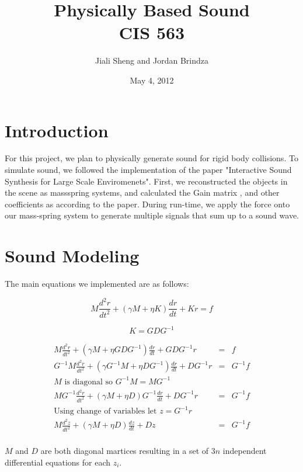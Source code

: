 \documentclass{article}
\begin{document}
\title{Physically Based Sound\\CIS 563}
\date{May 4, 2012}
\author{Jiali Sheng and Jordan Brindza}
\maketitle
  

\section{Introduction}
For this project, we plan to physically generate sound for rigid body collisions. To simulate sound, we followed the implementation of the paper "Interactive Sound Synthesis for Large Scale Enviromenets". First, we reconstructed the objects in the scene as massspring systems, and calculated the Gain matrix , and other coefficients as according to the paper. During run-time, we apply the force onto our mass-spring system to generate multiple signals that sum up to a sound wave. 

\section{Sound Modeling}
The main equations we implemented are as follows:

  $$
    M\frac{d^2 r}{dt^2} + (\gamma M + \eta K) \frac{dr}{dt} + Kr = f
  $$

  $$
    K = GDG^{-1}
  $$

  $$
    \begin{array}{ccc}
      M\frac{d^2 r}{dt^2} + (\gamma M + \eta GDG^{-1}) \frac{dr}{dt} + GDG^{-1}r & = & f \\[11pt]
      G^{-1} M\frac{d^2 r}{dt^2} + (\gamma G^{-1} M + \eta DG^{-1}) \frac{dr}{dt} + DG^{-1}r & = & G^{-1} f \\[11pt]
      \textrm{$M$ is diagonal so } G^{-1}M = MG^{-1} & & \\[11pt]
      M G^{-1} \frac{d^2 r}{dt^2} + (\gamma M + \eta D)G^{-1} \frac{dr}{dt} + DG^{-1}r & = & G^{-1} f \\[11pt]
      \textrm{Using change of variables let } z = G^{-1} r & & \\[11pt]
      M \frac{d^2 z}{dt^2} + (\gamma M + \eta D) \frac{dz}{dt} + Dz & = & G^{-1} f \\[11pt]
    \end{array}
  $$

  $M$ and $D$ are both diagonal martices resulting in a set of $3n$ independent differential equations for each $z_i$. 
\end{document}
